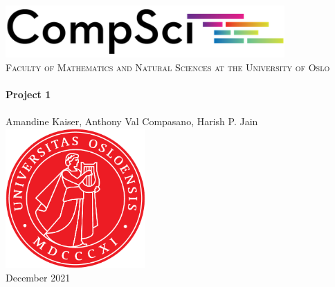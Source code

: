 \begin{titlepage}
    \vbox{ }

    \vbox{ }

    \begin{center}
        \includegraphics[width=0.8\textwidth]{Images/compsci_logo.png}\\[2cm]
        \textsc{\Large Faculty of Mathematics and Natural Sciences at the University of Oslo}\\[0.7cm]
        \noindent\makebox[\linewidth]{\rule{.7\paperwidth}{.6pt}}\\[0.7cm]
        { \huge \bfseries Project 1}\\[0.25cm]
        \noindent\makebox[\linewidth]{\rule{.7\paperwidth}{.6pt}}\\[0.7cm]
        \large{Amandine Kaiser, Anthony Val Compasano, Harish P. Jain}\\[2cm]
        \includegraphics[width=0.4\textwidth]{Images/UiO_logo.png}\\
        \vfill
        {\large December 2021}
    \end{center}
\end{titlepage}